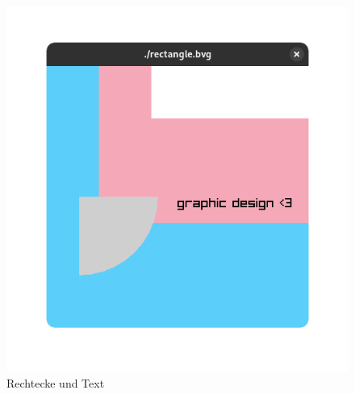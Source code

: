\begin{figure}[h]
\begin{minipage}[c]{0.4\linewidth}
    \includegraphics[width=\linewidth]{realisierung/images/bvg-rectangle.png}
    \caption{Rechtecke und Text}
  \end{minipage}
\end{figure}
\hypersetup{pageanchor=true}


